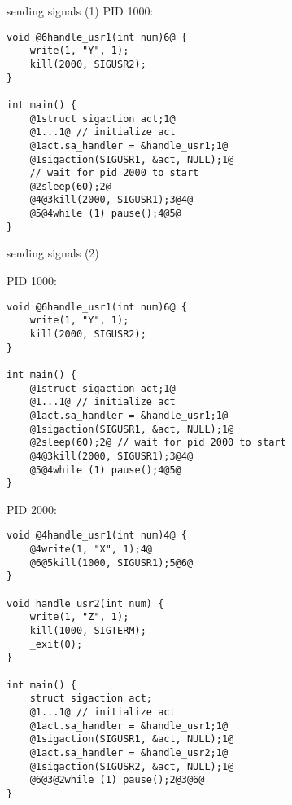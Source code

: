 \begin{frame}[fragile]{sending signals (1)}
PID 1000:
\begin{lstlisting}
void @6handle_usr1(int num)6@ {
    write(1, "Y", 1);
    kill(2000, SIGUSR2);
}

int main() {
    @1struct sigaction act;1@
    @1...1@ // initialize act
    @1act.sa_handler = &handle_usr1;1@
    @1sigaction(SIGUSR1, &act, NULL);1@
    // wait for pid 2000 to start
    @2sleep(60);2@
    @4@3kill(2000, SIGUSR1);3@4@
    @5@4while (1) pause();4@5@
}
\end{lstlisting}
\end{frame}

\begin{frame}[fragile]{sending signals (2)}
\begin{minipage}{0.4\textwidth}
PID 1000:
\begin{lstlisting}
void @6handle_usr1(int num)6@ {
    write(1, "Y", 1);
    kill(2000, SIGUSR2);
}

int main() {
    @1struct sigaction act;1@
    @1...1@ // initialize act
    @1act.sa_handler = &handle_usr1;1@
    @1sigaction(SIGUSR1, &act, NULL);1@
    @2sleep(60);2@ // wait for pid 2000 to start
    @4@3kill(2000, SIGUSR1);3@4@
    @5@4while (1) pause();4@5@
}
\end{lstlisting}
\end{minipage}
\begin{minipage}{0.4\textwidth}
PID 2000:
\begin{lstlisting}
void @4handle_usr1(int num)4@ {
    @4write(1, "X", 1);4@
    @6@5kill(1000, SIGUSR1);5@6@
}

void handle_usr2(int num) {
    write(1, "Z", 1);
    kill(1000, SIGTERM);
    _exit(0);
}

int main() {
    struct sigaction act;
    @1...1@ // initialize act
    @1act.sa_handler = &handle_usr1;1@
    @1sigaction(SIGUSR1, &act, NULL);1@
    @1act.sa_handler = &handle_usr2;1@
    @1sigaction(SIGUSR2, &act, NULL);1@
    @6@3@2while (1) pause();2@3@6@
}
\end{lstlisting}
\end{minipage}
\end{frame}
